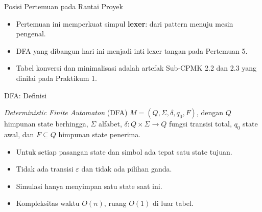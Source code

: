 \documentclass[aspectratio=169,10pt,t]{beamer}
\begin{document}
\begin{frame}{Posisi Pertemuan pada Rantai Proyek}

  \vspace{2pt}
  \begin{itemize}
    \item Pertemuan ini memperkuat simpul \textbf{lexer}: dari pattern
          menuju mesin pengenal.
    \item DFA yang dibangun hari ini menjadi inti lexer tangan pada
          Pertemuan 5.
    \item Tabel konversi dan minimalisasi adalah artefak Sub-CPMK 2.2
          dan 2.3 yang dinilai pada Praktikum 1.
  \end{itemize}
\end{frame}

\begin{frame}{DFA: Definisi}
  \begin{block}{\textit{Deterministic Finite Automaton} (DFA)}
    \small
    \(M = (Q, \Sigma, \delta, q_0, F)\), dengan \(Q\) himpunan state
    berhingga, \(\Sigma\) alfabet, \(\delta : Q \times \Sigma \to Q\)
    fungsi transisi total, \(q_0\) state awal, dan \(F \subseteq Q\)
    himpunan state penerima.
  \end{block}

  \begin{itemize}
    \item Untuk setiap pasangan state dan simbol ada tepat satu state
          tujuan.
    \item Tidak ada transisi \(\varepsilon\) dan tidak ada pilihan
          ganda.
    \item Simulasi hanya menyimpan satu state saat ini.
    \item Kompleksitas waktu \(O(n)\), ruang \(O(1)\) di luar tabel.
  \end{itemize}
\end{frame}
\end{document}

